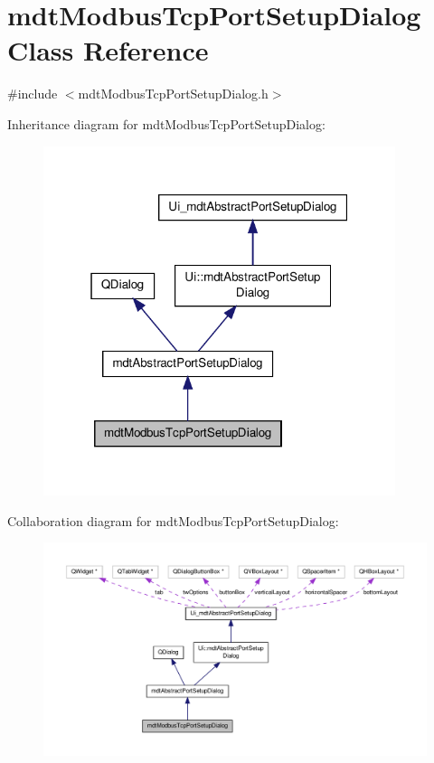 \hypertarget{classmdt_modbus_tcp_port_setup_dialog}{\section{mdt\-Modbus\-Tcp\-Port\-Setup\-Dialog Class Reference}
\label{classmdt_modbus_tcp_port_setup_dialog}
}


{\ttfamily \#include $<$mdt\-Modbus\-Tcp\-Port\-Setup\-Dialog.\-h$>$}



Inheritance diagram for mdt\-Modbus\-Tcp\-Port\-Setup\-Dialog\-:
\nopagebreak
\begin{figure}[H]
\begin{center}
\leavevmode
\includegraphics[width=292pt]{classmdt_modbus_tcp_port_setup_dialog__inherit__graph}
\end{center}
\end{figure}


Collaboration diagram for mdt\-Modbus\-Tcp\-Port\-Setup\-Dialog\-:
\nopagebreak
\begin{figure}[H]
\begin{center}
\leavevmode
\includegraphics[width=350pt]{classmdt_modbus_tcp_port_setup_dialog__coll__graph}
\end{center}
\end{figure}
